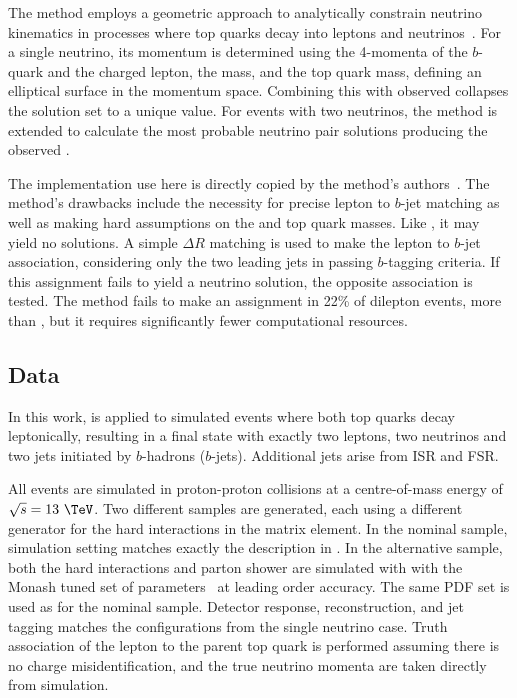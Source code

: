 The \ellipse method employs a geometric approach to analytically constrain neutrino kinematics in processes where top quarks decay into leptons and neutrinos~\cite{EllipseMethod}.
For a single neutrino, its momentum is determined using the 4-momenta of the $b$-quark and the charged lepton, the \Wboson mass, and the top quark mass, defining an elliptical surface in the momentum space.
Combining this with observed \ptmiss collapses the solution set to a unique value. For events with two neutrinos, the method is extended to calculate the most probable neutrino pair solutions producing the observed \ptmiss.

The implementation use here is directly copied by the method's authors~\cite{EllipseCode}.
The method's drawbacks include the necessity for precise lepton to $b$-jet matching as well as making hard assumptions on the \Wboson and top quark masses.
Like \vweight, it may yield no solutions.
A simple $\Delta R$ matching is used to make the lepton to $b$-jet association, considering only the two leading jets in passing $b$-tagging criteria.
If this assignment fails to yield a neutrino solution, the opposite association is tested.
The method fails to make an assignment in 22\% of \ttbar dilepton events, more than \vweight, but it requires significantly fewer computational resources.

\subsection{Data}

In this work, \vvflows is applied to simulated \ttbar events where both top quarks decay leptonically, resulting in a final state with exactly two leptons, two neutrinos and two jets initiated by $b$-hadrons ($b$-jets).
Additional jets arise from ISR and FSR.

All events are simulated in proton-proton collisions at a centre-of-mass energy of \mbox{$\sqrt{s}=13~\TeV$}.
Two different samples are generated, each using a different generator for the hard interactions in the matrix element.
In the nominal sample, simulation setting matches exactly the description in .
In the alternative sample, both the hard interactions and parton shower are simulated with  with the Monash tuned set of parameters~\cite{Monash} at leading order accuracy.
The same PDF set is used as for the nominal sample.
Detector response, reconstruction, and jet tagging matches the configurations from the single neutrino case.
Truth association of the lepton to the parent top quark is performed assuming there is no charge misidentification, and the true neutrino momenta are taken directly from simulation.

